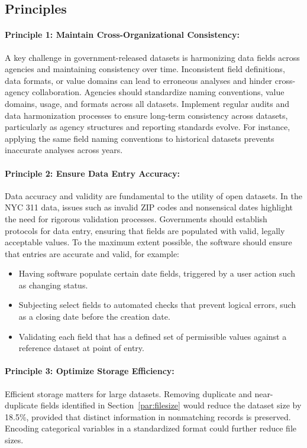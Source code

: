 \documentclass[linenumber]{jdsart}
\begin{document}
\subsection{Principles}
\label{subsec:principles}

\paragraph{Principle 1: Maintain Cross-Organizational Consistency:} A key
challenge in government-released datasets is harmonizing data fields 
across agencies and maintaining consistency over time. Inconsistent 
field definitions, data formats, or value
domains can lead to erroneous analyses and hinder 
cross-agency collaboration. Agencies should standardize naming 
conventions, value domains, usage, and formats across 
all datasets. Implement regular audits and data harmonization 
processes to ensure long-term consistency 
across datasets, particularly as agency structures 
and reporting standards evolve. For instance, applying the 
same field naming conventions to historical datasets prevents 
inaccurate analyses across years.

\paragraph{Principle 2: Ensure Data Entry Accuracy:}
Data accuracy and validity are fundamental to the utility of 
open datasets. In the NYC 311 data, issues such as 
invalid ZIP codes and nonsensical dates 
highlight the need for rigorous validation 
processes. Governments should establish protocols for 
data entry, ensuring that fields are populated with valid, legally 
acceptable values. To the maximum extent 
possible, the software should ensure that entries are 
accurate and valid, for example:

\begin{itemize}[left=1.5em,itemsep=0.15\baselineskip]
    \item Having software populate certain date fields, 
    triggered by a user action such as changing status.
    \item Subjecting select fields to automated checks that prevent 
    logical errors, such as a closing date before the creation date.
    \item Validating each field that has a defined set of permissible 
    values against a reference dataset at point of entry.
 \end{itemize}

\paragraph{Principle 3: Optimize Storage Efficiency:} Efficient storage 
matters for large datasets. Removing duplicate and near-duplicate 
fields identified in Section~\ref{par:filesize} would reduce 
the dataset size by 18.5\%, provided that distinct information 
in nonmatching records is preserved. Encoding categorical 
variables in a standardized format could further reduce file sizes.
\end{document}
